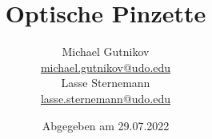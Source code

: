 

\title{Optische Pinzette}
\author{
  Michael Gutnikov\\
  \href{mailto:michael.gutnikov@udo.edu}{michael.gutnikov@udo.edu}\\
  Lasse Sternemann\\
  \href{mailto:lasse.sternemann@udo.edu}{lasse.sternemann@udo.edu}
}
\date{Abgegeben am 29.07.2022}


    \maketitle
    \newpage
    \tableofcontents
    \newpage

    
    
    


    \newpage
    \printbibliography

